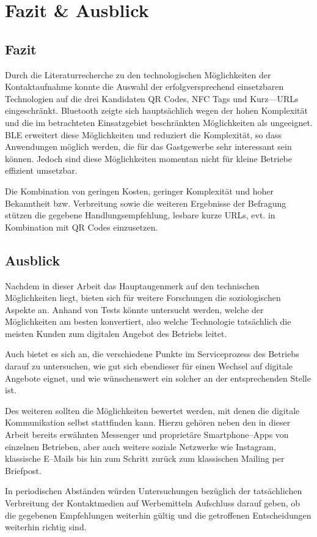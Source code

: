 \section{Fazit \& Ausblick}

\subsection{Fazit}

Durch die Literaturrecherche zu den technologischen Möglichkeiten der Kontaktaufnahme konnte die Auswahl der erfolgversprechend einsetzbaren Technologien auf die drei Kandidaten QR Codes, NFC Tags und Kurz—URLs eingeschränkt. Bluetooth zeigte sich hauptsächlich wegen der hohen Komplexität und die im betrachteten Einsatzgebiet beschränkten Möglichkeiten als ungeeignet. \ac{BLE} erweitert diese Möglichkeiten und reduziert die Komplexität, so dass Anwendungen möglich werden, die für das Gastgewerbe sehr interessant sein können. Jedoch sind diese Möglichkeiten momentan nicht für kleine Betriebe effizient umsetzbar.

Die Kombination von geringen Kosten, geringer Komplexität und hoher Bekanntheit bzw. Verbreitung sowie die weiteren Ergebnisse der Befragung stützen die gegebene Handlungsempfehlung, lesbare kurze \ac{URL}s, evt. in Kombination mit QR Codes einzusetzen.

\subsection{Ausblick}

Nachdem in dieser Arbeit das Hauptaugenmerk auf den technischen Möglichkeiten liegt, bieten sich für weitere Forschungen die soziologischen Aspekte an. Anhand von Tests könnte untersucht werden, welche der Möglichkeiten am besten konvertiert, also welche Technologie tatsächlich die meisten Kunden zum digitalen Angebot des Betriebs leitet.

Auch bietet es sich an, die verschiedene Punkte im Serviceprozess des Betriebs darauf zu untersuchen, wie gut sich ebendieser für einen Wechsel auf digitale Angebote eignet, und wie wünschenswert ein solcher an der entsprechenden Stelle ist.

Des weiteren sollten die Möglichkeiten bewertet werden, mit denen die digitale Kommunikation selbst stattfinden kann. Hierzu gehören neben den in dieser Arbeit bereits erwähnten Messenger und proprietäre Smartphone–Apps von einzelnen Betrieben, aber auch weitere soziale Netzwerke wie Instagram, klassische E–Mails bis hin zum Schritt zurück zum klassischen Mailing per Briefpost. 

In periodischen Abständen würden Untersuchungen bezüglich der tatsächlichen Verbreitung der Kontaktmedien auf Werbemitteln Aufschluss darauf geben, ob die gegebenen Empfehlungen weiterhin gültig und die getroffenen Entscheidungen weiterhin richtig sind.